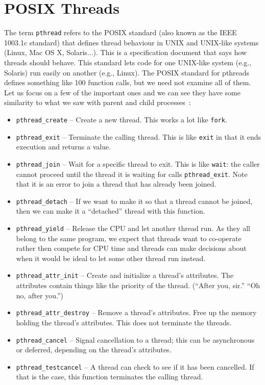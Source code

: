 \section*{POSIX Threads}

The term \texttt{pthread} refers to the POSIX standard (also known as the IEEE 1003.1c standard) that defines thread behaviour in UNIX and UNIX-like systems (Linux, Mac OS X, Solaris...). This is a specification document that says how threads should behave. This standard lets code for one UNIX-like system (e.g., Solaris) run easily on another (e.g., Linux). The POSIX standard for pthreads defines something like 100 function calls, but we need not examine all of them. Let us focus on a few of the important ones and we can see they have some similarity to what we saw with parent and child processes~\cite{mos}:

\begin{itemize}
	\item \texttt{pthread\_create} -- Create a new thread. This works a lot like \texttt{fork}.
	\item \texttt{pthread\_exit} -- Terminate the calling thread. This is like \texttt{exit} in that it ends execution and returns a value.
	\item \texttt{pthread\_join} -- Wait for a specific thread to exit. This is like \texttt{wait}: the caller cannot proceed until the thread it is waiting for calls \texttt{pthread\_exit}. Note that it is an error to join a thread that has already been joined.
	\item \texttt{pthread\_detach} -- If we want to make it so that a thread cannot be joined, then we can make it a ``detached'' thread with this function.
	\item \texttt{pthread\_yield} -- Release the CPU and let another thread run. As they all belong to the same program, we expect that threads want to co-operate rather then compete for CPU time and threads can make decisions about when it would be ideal to let some other thread run instead.
	\item \texttt{pthread\_attr\_init} -- Create and initialize a thread's attributes. The attributes contain things like the priority of the thread. (``After you, sir.'' ``Oh no, after you.'')
	\item \texttt{pthread\_attr\_destroy} -- Remove a thread's attributes. Free up the memory holding the thread's attributes. This does not terminate the threads.
	\item \texttt{pthread\_cancel} -- Signal cancellation to a thread; this can be asynchronous or deferred, depending on the thread's attributes.
	\item \texttt{pthread\_testcancel} -- A thread can check to see if it has been cancelled. If that is the case, this function terminates the calling thread.
\end{itemize}

